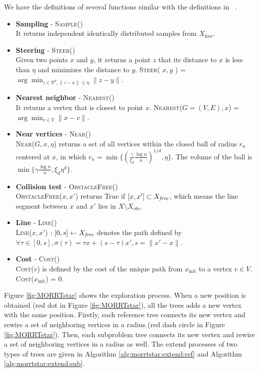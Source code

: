 \documentclass[conference]{IEEEtran}
\begin{document}
We have the definitions of several functions similar with the definitions in ~\cite{Karaman.Frazzoli:RSS10}.
\begin{itemize}
	\item \textbf{Sampling} - \textsc{Sample}() \\
	It returns independent identically distributed samples from $ X_{\mbox{free}} $.
	\item \textbf{Steering} - \textsc{Steer}() \\
	Given two points $ x $ and $ y $, it returns a point $ z $ that its distance to $ x $ is less than $ \eta $ and minimizes the distance to $ y $. 
	\textsc{Steer}( $ x,y $ ) = $ \arg \min_{ z \in \mathbb{R}^{d}, \lVert z -x \rVert \leq \eta } \lVert z - y \rVert $.
	\item \textbf{Nearest neighbor} - \textsc{Nearest}() \\
	It returns a vertex that is closest to point $ x $.
	\textsc{Nearest}($ G = (V,E), x $) = $ \arg \min_{v \in V} \lVert x - v \rVert $.
	\item \textbf{Near vertices} - \textsc{Near}() \\
	\textsc{Near}($ G, x, \eta $) returns a set of all vertices within the closed ball of radius $ r_{n} $ centered at $ x $, in which $ r_{n} = \min \{ ( \frac{\gamma}{\xi_{d}} \frac{\log n}{n} )^{1/d}  , \eta \} $.
	The volume of the ball is $ \min \{ \gamma \frac{\log n}{n} , \xi_{d} \eta^{d} \} $.
	\item \textbf{Collision test} - \textsc{ObstacleFree}() \\
	\textsc{ObstacleFree}($ x, x' $) returns True if $ [ x, x' ] \subset X_{\it free} $, which means the line segment between $ x $ and $ x' $ lies in $ X \setminus X_{obs} $.
	\item \textbf{Line} - \textsc{Line}() \\
	\textsc{Line}($ x, x' $) $ : [0, s] \leftarrow X_{\it free} $ denotes the path defined by $ \forall \tau \in [0, s], \sigma( \tau ) = \tau x + (s - \tau) x', s = \lVert x' -x \rVert $.
	\item \textbf{Cost} - \textsc{Cost}() \\
	\textsc{Cost}($ v  $) is defined by the cost of the unique path from $ x_{ \mbox{init} } $ to a vertex $ v \in V $.
	\textsc{Cost}($ x_{ \mbox{init} } $) = $ 0 $.
\end{itemize}

Figure \ref{fig:MORRTstar} shows the exploration process.
When a new position is obtained (red dot in Figure \ref{fig:MORRTstar}), all the trees adds a new vertex with the same position.
Firstly, each reference tree connects its new vertex and rewire a set of neighboring vertices in a radius (red dash circle in Figure \ref{fig:MORRTstar}).
Then, each subproblem tree connects its new vertex and rewire a set of neighboring vertices in a radius as well.
The extend processes of two types of trees are given in Algorithm \ref{alg:morrtstar:extend:ref} and Algorithm \ref{alg:morrtstar:extend:sub}.
\end{document}
